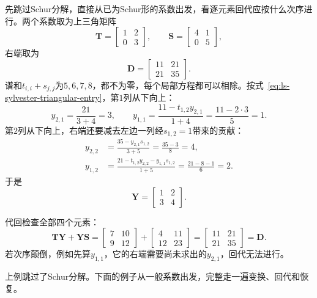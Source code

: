 \begin{example}[Schur形方程的逐元素回代]
\label{ex:ls-sylvester-schur-form-entries}
先跳过Schur分解，直接从已为Schur形的系数出发，看逐元素回代应按什么次序进行。两个系数取为上三角矩阵
\[
 \bm T=\begin{bmatrix}1&2\\0&3\end{bmatrix},\qquad
 \bm S=\begin{bmatrix}4&1\\0&5\end{bmatrix},
\]
右端取为
\[
 \bm D=\begin{bmatrix}11&21\\21&35\end{bmatrix}.
\]
谱和$t_{i,i}+s_{j,j}$为$5,6,7,8$，都不为零，每个局部方程都可以相除。按式~\eqref{eq:ls-sylvester-triangular-entry}，第$1$列从下向上：
\[
 y_{2,1}=\frac{21}{3+4}=3,\qquad
 y_{1,1}=\frac{11-t_{1,2}y_{2,1}}{1+4}=\frac{11-2\cdot3}{5}=1 .
\]
第$2$列从下向上，右端还要减去左边一列经$s_{1,2}=1$带来的贡献：
\[
 \begin{aligned}
 y_{2,2}&=\frac{35-y_{2,1}s_{1,2}}{3+5}=\frac{35-3}{8}=4,\\
 y_{1,2}&=\frac{21-t_{1,2}y_{2,2}-y_{1,1}s_{1,2}}{1+5}=\frac{21-8-1}{6}=2 .
 \end{aligned}
\]
于是
\[
 \bm Y=\begin{bmatrix}1&2\\3&4\end{bmatrix}.
\]

代回检查全部四个元素：
\[
 \bm T\bm Y+\bm Y\bm S
 =\begin{bmatrix}7&10\\9&12\end{bmatrix}+\begin{bmatrix}4&11\\12&23\end{bmatrix}
 =\begin{bmatrix}11&21\\21&35\end{bmatrix}=\bm D .
\]
若次序颠倒，例如先算$y_{1,1}$，它的右端需要尚未求出的$y_{2,1}$，回代无法进行。
\end{example}

上例跳过了Schur分解。下面的例子从一般系数出发，完整走一遍变换、回代和恢复。

